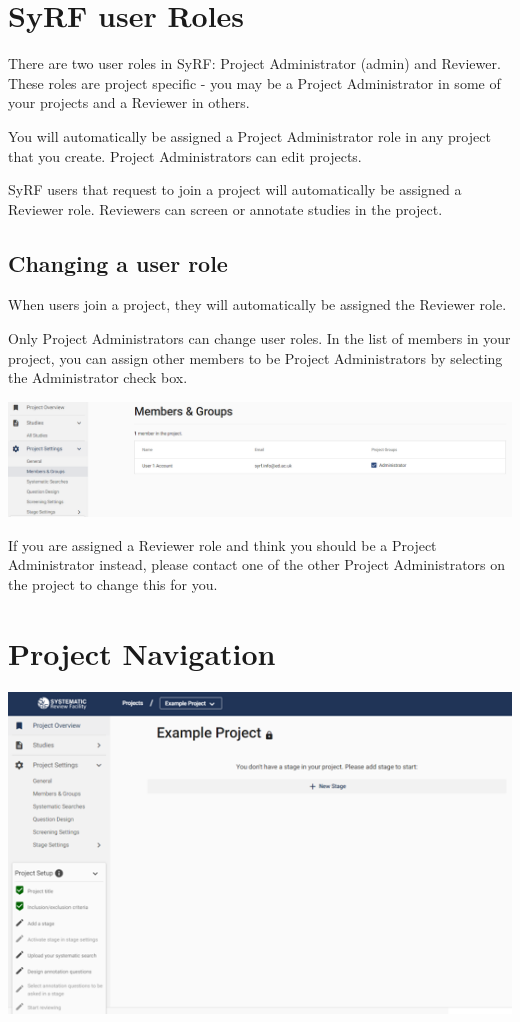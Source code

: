 \documentclass[
]{book}
\begin{document}
\hypertarget{roles}{%
\chapter{SyRF user Roles}\label{roles}}

There are two user roles in SyRF: Project Administrator (admin) and Reviewer. These roles are project specific - you may be a Project Administrator in some of your projects and a Reviewer in others.

You will automatically be assigned a Project Administrator role in any project that you create. Project Administrators can edit projects.

SyRF users that request to join a project will automatically be assigned a Reviewer role. Reviewers can screen or annotate studies in the project.

\hypertarget{changing-a-user-role}{%
\section{Changing a user role}\label{changing-a-user-role}}

When users join a project, they will automatically be assigned the Reviewer role.

Only Project Administrators can change user roles. In the list of members in your project, you can assign other members to be Project Administrators by selecting the Administrator check box.

\includegraphics[width=28.92in]{figs/Fig_Change_user_role}

If you are assigned a Reviewer role and think you should be a Project Administrator instead, please contact one of the other Project Administrators on the project to change this for you.

\hypertarget{nagivation}{%
\chapter{Project Navigation}\label{nagivation}}

\includegraphics[width=7.57in]{figs/Fig_Project_Nav}
\end{document}
